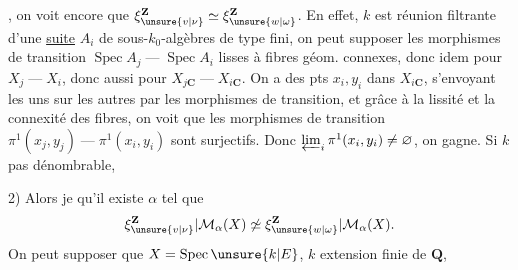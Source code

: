 , on voit encore que
$\xi_{\unsure{v|\nu}}^{\mathbf Z}\simeq\xi_{\unsure{w|\omega}}^{\mathbf Z}$.
En effet, $k$ est réunion filtrante d’une \uline{suite} $A_i$ de sous-$k_0$-algèbres de type fini,
on peut supposer les morphismes de transition
$\operatorname{Spec}A_j\mathbin{—}\operatorname{Spec}A_i$
lisses à fibres géom. connexes, donc idem pour $X_j\mathbin{—}X_i$,
donc aussi pour $X_{j\mathbf C}\mathbin{—}X_{i\mathbf C}$.
On a des pts $x_i,y_i$ dans $X_{i\mathbf C}$, s’envoyant les uns sur les autres par les
morphismes de transition, et grâce à la lissité et la connexité des fibres,
on voit que les morphismes de transition
$\pi^1(x_j,y_j)\mathbin{—}\pi^1(x_i,y_i)$ sont surjectifs.
Donc $\varprojlim_i\pi^1(x_i,y_i)\ne\varnothing$, on gagne.
Si $k$ pas dénombrable,

2) 
Alors je  qu’il existe $\alpha$ tel que
\[
 \xi_{\unsure{v|\nu}}^{\mathbf Z}|\mathcal M_\alpha(X)
 \not\simeq
 \xi_{\unsure{w|\omega}}^{\mathbf Z}|\mathcal M_\alpha(X).
\]
On peut supposer que $X=\operatorname{Spec}\unsure{k|E}$, $k$ extension finie de $\mathbf Q$,
